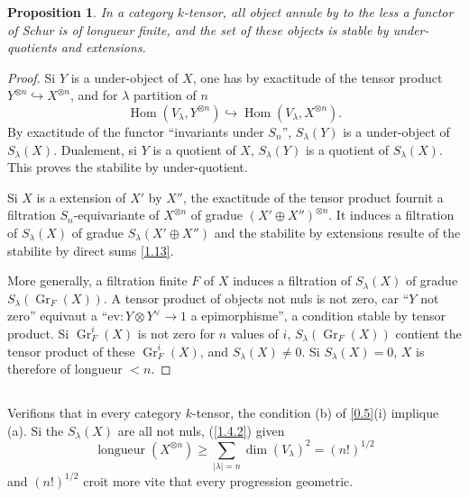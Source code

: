 \documentclass[11pt,a4paper]{article}
\theoremstyle{plain}
\newtheorem{proposition}[theorem]{Proposition}
\theoremstyle{definition}
\DeclareMathOperator{\Hom}{Hom}
\DeclareMathOperator{\longueur}{longueur}
\DeclareMathOperator{\Gr}{Gr}
\newcommand{\ev}{\mathrm{ev}}
\begin{document}
\begin{proposition}\label{1.19}
In a category $k$-tensor, all object annule by to the less a functor of Schur is of longueur finite, and the set of these objects is stable by under-quotients and extensions.
\end{proposition}

\begin{proof}
Si $Y$ is a under-object of $X$, one has by exactitude of the tensor product $Y^{\otimes n}\hookrightarrow X^{\otimes n}$, and for $\lambda$ partition of $n$
\[
\Hom(V_\lambda,Y^{\otimes n})\hookrightarrow\Hom(V_\lambda,X^{\otimes n}).
\]
By exactitude of the functor ``invariants under $S_n$'', $S_\lambda(Y)$ is a under-object of $S_\lambda(X)$. Dualement, si $Y$ is a quotient of $X$, $S_\lambda(Y)$ is a quotient of $S_\lambda(X)$. This proves the stabilite by under-quotient.

Si $X$ is a extension of $X'$ by $X''$, the exactitude of the tensor product fournit a filtration $S_n$-equivariante of $X^{\otimes n}$ of gradue $(X'\oplus X'')^{\otimes n}$. It induces a filtration of $S_\lambda(X)$ of gradue $S_\lambda(X'\oplus X'')$ and the stabilite by extensions resulte of the stabilite by direct sums \ref{1.13}.

More generally, a filtration finite $F$ of $X$ induces a filtration of $S_\lambda(X)$ of gradue $S_\lambda(\Gr_F(X))$. A tensor product of objects not nuls is not zero, car ``$Y$ not zero'' equivaut a ``$\ev:Y\otimes Y^\vee\to1$ a epimorphisme'', a condition stable by tensor product. Si $\Gr_F^i(X)$ is not zero for $n$ values of $i$, $S_\lambda(\Gr_F(X))$ contient the tensor product of these $\Gr_F^i(X)$, and $S_\lambda(X)\neq0$. Si $S_\lambda(X)=0$, $X$ is therefore of longueur $<n$.
\end{proof}

\subsection{}\label{1.20}

Verifions that in every category $k$-tensor, the condition (b) of \ref{0.5}(i) implique (a). Si the $S_\lambda(X)$ are all not nuls, (\ref{1.4.2}) given
\[
\longueur(X^{\otimes n})\geq\sum_{|\lambda|=n}\dim(V_\lambda)^2=(n!)^{1/2}
\]
and $(n!)^{1/2}$ croit more vite that every progression geometric.

\subsection{}\label{1.21}
\end{document}
